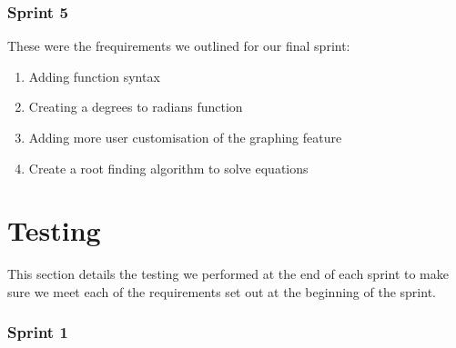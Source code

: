 \documentclass[a4paper, oneside, 11pt]{report}
\begin{document}
\subsection{Sprint 5}
These were the frequirements we outlined for our final sprint:
\begin{enumerate}
\item Adding function syntax
\item Creating a degrees to radians function
\item Adding more user customisation of the graphing feature
\item Create a root finding algorithm to solve equations
\end{enumerate}


\chapter{Testing}

This section details the testing we performed at the end of each sprint to make sure we meet each of the requirements set out at the beginning of the sprint.

\subsection{Sprint 1}
\end{document}

